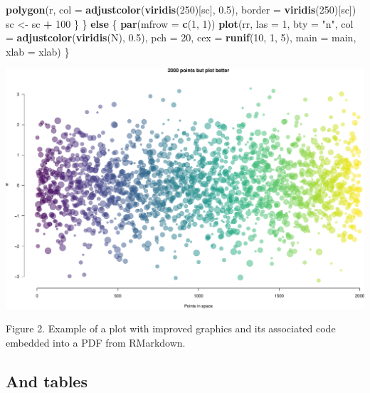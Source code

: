 \documentclass[10,portrait]{article}
\newenvironment{Shaded}{\begin{snugshade}}{\end{snugshade}}
\newcommand{\KeywordTok}[1]{\textcolor[rgb]{0.13,0.29,0.53}{\textbf{#1}}}
\newcommand{\DataTypeTok}[1]{\textcolor[rgb]{0.13,0.29,0.53}{#1}}
\newcommand{\DecValTok}[1]{\textcolor[rgb]{0.00,0.00,0.81}{#1}}
\newcommand{\FloatTok}[1]{\textcolor[rgb]{0.00,0.00,0.81}{#1}}
\newcommand{\StringTok}[1]{\textcolor[rgb]{0.31,0.60,0.02}{#1}}
\newcommand{\ControlFlowTok}[1]{\textcolor[rgb]{0.13,0.29,0.53}{\textbf{#1}}}
\newcommand{\OperatorTok}[1]{\textcolor[rgb]{0.81,0.36,0.00}{\textbf{#1}}}
\newcommand{\NormalTok}[1]{#1}
\begin{document}
\begin{Shaded}
\begin{Highlighting}[]
        \KeywordTok{polygon}\NormalTok{(r, }\DataTypeTok{col =} \KeywordTok{adjustcolor}\NormalTok{(}\KeywordTok{viridis}\NormalTok{(}\DecValTok{250}\NormalTok{)[sc], }\FloatTok{0.5}\NormalTok{), }\DataTypeTok{border =} \KeywordTok{viridis}\NormalTok{(}\DecValTok{250}\NormalTok{)[sc])}
\NormalTok{        sc <-}\StringTok{ }\NormalTok{sc }\OperatorTok{+}\StringTok{ }\DecValTok{100}
\NormalTok{    \}}
\NormalTok{\} }\ControlFlowTok{else}\NormalTok{ \{}
    \KeywordTok{par}\NormalTok{(}\DataTypeTok{mfrow =} \KeywordTok{c}\NormalTok{(}\DecValTok{1}\NormalTok{, }\DecValTok{1}\NormalTok{))}
    \KeywordTok{plot}\NormalTok{(rr, }\DataTypeTok{las =} \DecValTok{1}\NormalTok{, }\DataTypeTok{bty =} \StringTok{"n"}\NormalTok{, }\DataTypeTok{col =} \KeywordTok{adjustcolor}\NormalTok{(}\KeywordTok{viridis}\NormalTok{(N), }\FloatTok{0.5}\NormalTok{), }\DataTypeTok{pch =} \DecValTok{20}\NormalTok{, }\DataTypeTok{cex =} \KeywordTok{runif}\NormalTok{(}\DecValTok{10}\NormalTok{, }\DecValTok{1}\NormalTok{, }\DecValTok{5}\NormalTok{), }
        \DataTypeTok{main =}\NormalTok{ main, }\DataTypeTok{xlab =}\NormalTok{ xlab)}
\NormalTok{\}}
\end{Highlighting}
\end{Shaded}

\includegraphics{R_is_dope_files/figure-latex/unnamed-chunk-4-1.pdf}

Figure 2. Example of a plot with improved graphics and its associated
code embedded into a PDF from RMarkdown.

\newpage  

\subsection{And tables}\label{and-tables}
\end{document}
